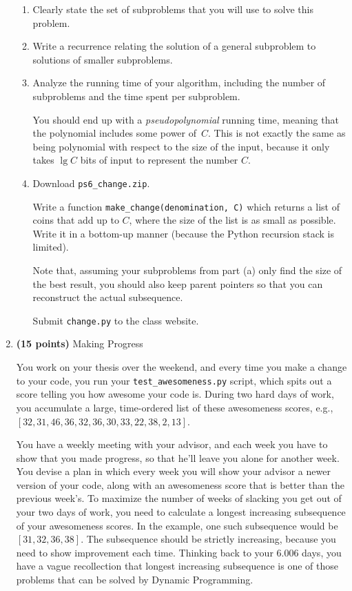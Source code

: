 \documentclass[12pt,twoside]{article}
\begin{document}
\begin{enumerate}
  \begin{enumerate}
  \item Clearly state the set of subproblems that you will use to
    solve this problem.
  \item Write a recurrence relating the solution of a general
    subproblem to solutions of smaller subproblems.
  \item Analyze the running time of your algorithm, including the
    number of subproblems and the time spent per subproblem. 

    You should end up with a \emph{pseudopolynomial} running time,
    meaning that the polynomial includes some power of~$C$. This is
    not exactly the same as being polynomial with respect to the size
    of the input, because it only takes $\lg C$ bits of input to
    represent the number $C$.
  \item Download \verb|ps6_change.zip|.

    Write a function \verb|make_change(denomination, C)| which returns
    a list of coins that add up to $C$, where the size of the list is
    as small as possible. Write it in a bottom-up manner (because the
    Python recursion stack is limited).

    Note that, assuming your subproblems from part (a) only find the
    size of the best result, you should also keep parent pointers so
    that you can reconstruct the actual subsequence.
    
    Submit \verb|change.py| to the class website.

  \end{enumerate}

\newpage

\item {\bf (15 points)} Making Progress

  You work on your thesis over the weekend, and every time you make a
  change to your code, you run your \verb|test_awesomeness.py| script,
  which spits out a score telling you how awesome your code is. During
  two hard days of work, you accumulate a large, time-ordered list of
  these awesomeness scores, e.g., $[32, 31, 46, 36, 32, 36, 30, 33,
  22, 38, 2, 13]$.

  You have a weekly meeting with your advisor, and each week you have
  to show that you made progress, so that he'll leave you alone for
  another week. You devise a plan in which every week you will show
  your advisor a newer version of your code, along with an awesomeness
  score that is better than the previous week's.  To maximize the
  number of weeks of slacking you get out of your two days of work,
  you need to calculate a longest increasing subsequence of your
  awesomeness scores. In the example, one such subsequence would be
  $[31, 32, 36, 38]$. The subsequence should be strictly increasing,
  because you need to show improvement each time. Thinking back to
  your 6.006 days, you have a vague recollection that longest
  increasing subsequence is one of those problems that can be solved
  by Dynamic Programming.


\end{enumerate}
\end{document}

